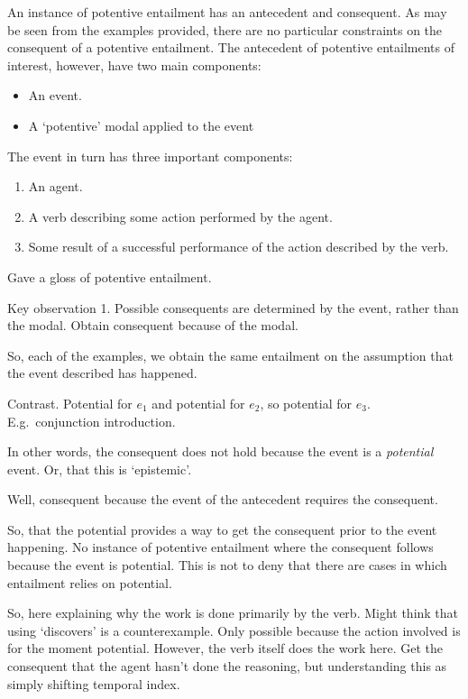 \begin{note}
  An instance of potentive entailment has an antecedent and consequent.
  As may be seen from the examples provided, there are no particular constraints on the consequent of a potentive entailment.
  The antecedent of potentive entailments of interest, however, have two main components:
  \begin{itemize}
  \item\label{pe:part:event} An event.
  \item\label{pe:part:modal} A `potentive' modal applied to the event
  \end{itemize}
  The event in turn has three important components:
  \begin{enumerate}
  \item\label{pe:part:agent} An agent.
  \item\label{pe:part:verb} A verb describing some action performed by the agent.
  \item\label{pe:part:result} Some result of a successful performance of the action described by the verb.
  \end{enumerate}

  Gave a gloss of potentive entailment.

  Key observation 1.
  Possible consequents are determined by the event, rather than the modal.
  Obtain consequent because of the modal.

  So, each of the examples, we obtain the same entailment on the assumption that the event described has happened.

  Contrast.
  Potential for \(e_{1}\) and potential for \(e_{2}\), so potential for \(e_{3}\).
  E.g.\ conjunction introduction.

  In other words, the consequent does not hold because the event is a \emph{potential} event.
  Or, that this is `epistemic'.

  Well, consequent because the event of the antecedent requires the consequent.

  So, that the potential provides a way to get the consequent prior to the event happening.
  No instance of potentive entailment where the consequent follows because the event is potential.
  This is not to deny that there are cases in which entailment relies on potential.

  So, here explaining why the work is done primarily by the verb.
  Might think that using `discovers' is a counterexample.
  Only possible because the action involved is for the moment potential.
  However, the verb itself does the work here.
  Get the consequent that the agent hasn't done the reasoning, but understanding this as simply shifting temporal index.


\end{note}
